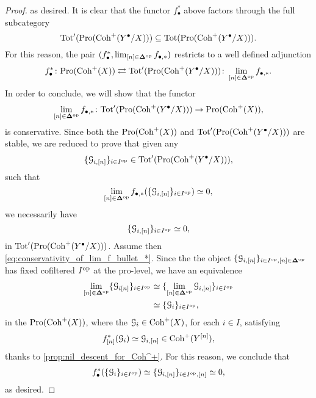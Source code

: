 \documentclass[10pt,a4paper,reqno]{amsart} %
\theoremstyle{plain}
\theoremstyle{definition}
\theoremstyle{remark}
\numberwithin{equation}{section}
\begin{document}
\begin{proof}
    as desired. 
    It is clear that the functor $f_{\bullet
    }^*$ above factors through the full subcategory
        \[
            \mathrm{Tot}'(\mathrm{Pro}( \mathrm{Coh}^+(Y^\bullet / X)))  \subseteq \mathrm{Tot}(\mathrm{Pro}(\mathrm{Coh}^+(Y^\bullet/X))).
        \]
    For this reason, the pair $(f_\bullet^*, \lim_{[n] \in \bm{\Delta} ^\mathrm{op}} f_{\bullet, *})$ restricts to a well defined adjunction
        \[
            f^*_{\bullet} \colon \mathrm{Pro}(\mathrm{Coh}^+(X))  \rightleftarrows  \mathrm{Tot}'(\mathrm{Pro}(\mathrm{Coh}^+(Y^\bullet/ X))) \colon \lim_{[n] \in \bm{\Delta} ^\mathrm{op}} f_{\bullet, *}.  
        \]
    In order to conclude, we will show that the functor
        \[
            \lim_{[n] \in \bm{\Delta} ^\mathrm{op}} f_{\bullet, *} \colon  \mathrm{Tot}'(\mathrm{Pro}(\mathrm{Coh}^+(Y^\bullet/X))) \to \mathrm{Pro}(\mathrm{Coh}^+(X)) ,  
        \]
    is conservative. Since both the \infcats $\mathrm{Pro}(\mathrm{Coh}^+(X))$ and $\mathrm{Tot}'(\mathrm{Pro}(\mathrm{Coh}^+(Y^\bullet/X)))$ are stable, we are reduced to prove that given any
        \[
            \{ \mathcal G_{i, [n]} \}_{i \in I^\mathrm{op}} \in \mathrm{Tot}'(\mathrm{Pro}(\mathrm{Coh}^+(Y^\bullet/X))),  
        \]
    such that 
        \begin{equation} \label{eq:conservativity_of_lim_f_bullet_*}
            \lim_{[n] \in \bm{\Delta} ^\mathrm{op}} f_{\bullet, *}( \{ \mathcal G_{i, [n]} \}_{i \in I^\mathrm{op}})  \simeq 0,
        \end{equation}
    we necessarily have
        \[
            \{ \mathcal G_{i, [n]} \}_{i \in I^\mathrm{op}} \simeq 0  ,
        \]
    in $\mathrm{Tot}'(\mathrm{Pro}(\mathrm{Coh}^+(Y^\bullet / X)))$.
    Assume then \eqref{eq:conservativity_of_lim_f_bullet_*}. Since the the object $\{ \mathcal G_{i, [n]} \}_{i \in I ^\mathrm{op}, [n] \in \bm{\Delta} ^\mathrm{op}}$ has fixed cofiltered \infcat $I ^\mathrm{op}$
    at the pro-level, we have an equivalence
        \begin{align*}
            \lim_{[n] \in \bm{\Delta} ^\mathrm{op}} \{ \mathcal G_{i [n]} \}_{i \in I^\mathrm{op}}   & \simeq \{ \lim_{[n] \in \bm{\Delta} ^\mathrm{op}} \mathcal G_{i, [n]} \}_{i \in I^\mathrm{op}} \\
                                                                        & \simeq \{ \mathcal G_i \}_{i \in I^\mathrm{op}},                                      
        \end{align*}
    in the \infcat $\mathrm{Pro}(\mathrm{Coh}^+(X))$, where the $\mathcal G_i \in \mathrm{Coh}^+(X)$, for each $i \in I$, satisfying
        \[
            f_{[n]}^* (\mathcal G_i) \simeq \mathcal G_{i , [n]} \in \mathrm{Coh}^+(Y^{[n]}),  
        \]
    thanks to \cref{prop:nil_descent_for_Coh^+}. For this reason, we conclude that  
        \begin{align*}
            f^*_{\bullet}(\{ \mathcal G_i \}_{i \in I^\mathrm{op}}) \simeq \{\mathcal G_{i, [n]} \}_{i \in I^\mathrm{op}, [n]} \simeq 0,  
        \end{align*}
    as desired.
\end{proof}
\end{document}
